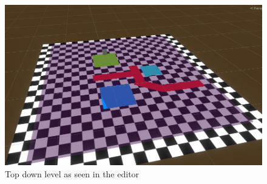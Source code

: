 \begin{figure}[p]
  \centering
  \includegraphics[width=\imgWidth]{images/workflow/TopDownLevel.png}
  \caption{Top down level as seen in the editor}
  \label{TopDownUnity}
\end{figure}

